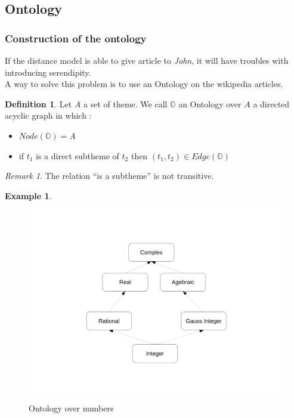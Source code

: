 \documentclass[11pt]{article}
\theoremstyle{plain}
\theoremstyle{definition}
\newtheorem{defn}{Definition}[section]
\newtheorem{exmp}{Example}[section]
\theoremstyle{remark}
\newtheorem*{rem}{Remark}
\begin{document}
\subsection{Ontology}
\subsubsection{Construction of the ontology}
If the distance model is able to give article to \textit{John}, it  will have troubles with introducing serendipity.\\
A way to solve this problem is to use an Ontology on the wikipedia articles.

\vspace*{5mm}
\begin{defn}
  Let $A$ a set of theme. We call $\mathbb{O}$ an Ontology over $A$ a directed acyclic graph in which :
  \begin{itemize}
  \item $ Node(\mathbb{O}) = A$
  \item if $t_1$ is a direct subtheme of $t_2$ then $(t_1,t_2) \in Edge(\mathbb{O})$
  \end{itemize}
\end{defn}

\vspace*{5mm}

\begin{rem}
  The relation ``is a subtheme'' is not transitive.
\end{rem}
\vspace*{5mm}
\newpage
\begin{exmp}
\end{exmp}
\begin{figure}[!h]
  \center
  \includegraphics[scale = 0.3]{ExOntology.pdf}
  \caption{Ontology over numbers}
\end{figure}
\end{document}
